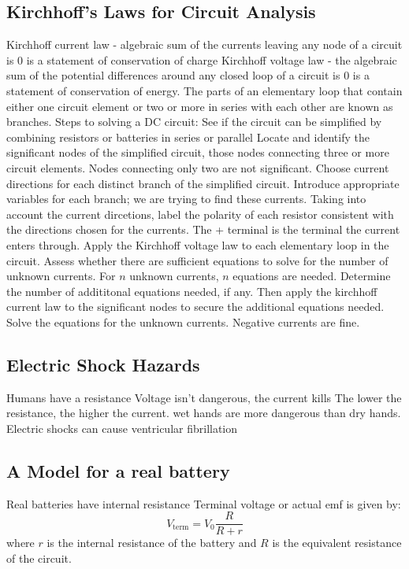 \documentclass[twocolumn]{article}
\begin{document}
\subsection{Kirchhoff's Laws for Circuit Analysis}
\begin{outline}
	\1 Kirchhoff current law - algebraic sum of the currents leaving any node of a circuit is 0
		\2 is a statement of conservation of charge
	\1 Kirchhoff voltage law - the algebraic sum of the potential differences around any closed loop of a circuit is 0
		\2 is a statement of conservation of energy. 
	\1 The parts of an elementary loop that contain either one circuit element or two or more in series with each other are known as branches. 
	\1 Steps to solving a DC circuit: 
		\2 See if the circuit can be simplified by combining resistors or batteries in series or parallel
		\2 Locate and identify the significant nodes of the simplified circuit, those nodes connecting three or more circuit elements. Nodes connecting only two are not significant. 
		\2 Choose current directions for each distinct branch of the simplified circuit. Introduce appropriate variables for each branch; we are trying to find these currents. 
		\2 Taking into account the current dircetions, label the polarity of each resistor consistent with the directions chosen for the currents. The + terminal is the terminal the current enters through. 
		\2 Apply the Kirchhoff voltage law to each elementary loop in the circuit. 
		\2 Assess whether there are sufficient equations to solve for the number of unknown currents. For $n$ unknown currents, $n$ equations are needed. Determine the number of addititonal equations needed, if any. Then apply the kirchhoff current law to the significant nodes to secure the additional equations needed. 
		\2 Solve the equations for the unknown currents. Negative currents are fine. 
\end{outline}
\subsection{Electric Shock Hazards}
\begin{outline}
	\1 Humans have a resistance 
	\1 Voltage isn't dangerous, the current kills
	\1 The lower the resistance, the higher the current. wet hands are more dangerous than dry hands. 
	\1 Electric shocks can cause ventricular fibrillation
	
\end{outline}
\subsection{A Model for a real battery}
\begin{outline}
	\1 Real batteries have internal resistance
	\1 Terminal voltage or actual emf is given by: \[V_{\text{term}}=V_0\dfrac{R}{R+r}\] where $r$ is the internal resistance of the battery and $R$ is the equivalent resistance of the circuit. 

\end{outline}
\end{document}
